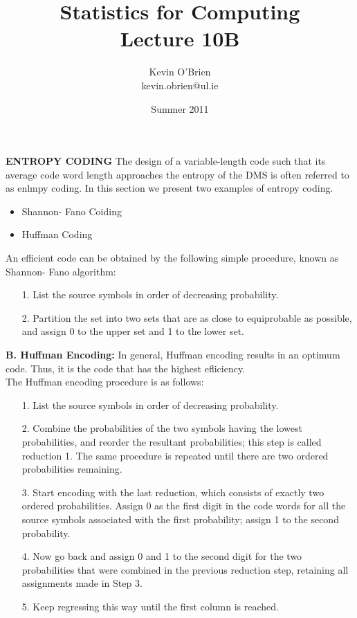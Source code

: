 \documentclass[a4]{beamer}
\title[MA4413t]{Statistics for Computing \\ {\normalsize Lecture 10B}}
\author[Kevin O'Brien]{Kevin O'Brien \\ {\scriptsize kevin.obrien@ul.ie}}
\date{Summer 2011}
\institute[Maths \& Stats]{Dept. of Mathematics \& Statistics, \\ University \textit{of} Limerick}
\begin{document}
\medskip
\noindent \textbf{ ENTROPY CODING}
The design of a variable-length code such that its average code word length approaches the
entropy of the DMS is often referred to as enlmpy coding. In this section we present two examples of
entropy coding.
\begin{itemize}
	\item Shannon- Fano Coiding
	\item Huffman Coding
\end{itemize}

\medskip
An efficient code can be obtained by the following simple procedure, known as
Shannon- Fano algorithm:
\begin{itemize}
\item[1.] List the source symbols in order of decreasing probability.
\item[2.] Partition the set into two sets that are as close to equiprobable as possible, and assign 0 to the
upper set and 1 to the lower set.
\end{itemize}


\medskip\noindent \textbf{B. Huffman Encoding:}
In general, Huffman encoding results in an optimum code. Thus, it is the code that has the highest
efliciency.\\ The Huffman encoding procedure is as follows:
\begin{itemize}\item[1.] List the source symbols in order of decreasing probability.
\item[2.] Combine the probabilities of the two symbols having the lowest probabilities, and reorder
the resultant probabilities; this step is called reduction 1. The same procedure is repeated until
there are two ordered probabilities remaining.
\item[3.] Start encoding with the last reduction, which consists of exactly two ordered probabilities. Assign
0 as the first digit in the code words for all the source symbols associated with the first probability;
assign 1 to the second probability.
\item[4.] Now go back and assign 0 and 1 to the second digit for the two probabilities that were combined
in the previous reduction step, retaining all assignments made in Step 3.
\item[5.] Keep regressing this way until the first column is reached.
\end{itemize}
\end{document}
